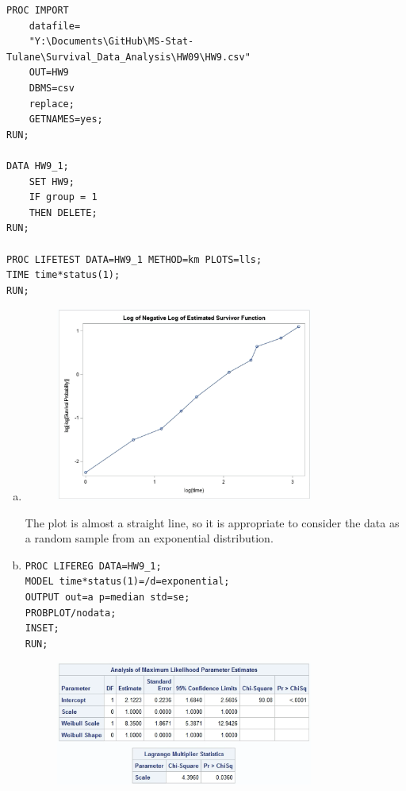 \documentclass{elegantbook}
\begin{document}
\begin{solution}
    \begin{verbatim}
PROC IMPORT
    datafile=
    "Y:\Documents\GitHub\MS-Stat-Tulane\Survival_Data_Analysis\HW09\HW9.csv"
    OUT=HW9
    DBMS=csv
    replace;
    GETNAMES=yes;
RUN;

DATA HW9_1;
    SET HW9;
    IF group = 1
    THEN DELETE;
RUN;

PROC LIFETEST DATA=HW9_1 METHOD=km PLOTS=lls;
TIME time*status(1);
RUN;
    \end{verbatim}
    \begin{enumerate}[(a)]
        \item \begin{figure}[H]
            \centering
            \includegraphics[width=0.8\textwidth]{HW9_1a.png}
        \end{figure}
        The plot is almost a straight line, so it is appropriate to consider the data as a random sample from an exponential distribution.
        \item \begin{verbatim}
PROC LIFEREG DATA=HW9_1;
MODEL time*status(1)=/d=exponential;
OUTPUT out=a p=median std=se;
PROBPLOT/nodata;
INSET;
RUN;
        \end{verbatim}
        \begin{figure}[H]
            \centering
            \includegraphics[width=0.8\textwidth]{HW9_1b.png}

\end{figure}
\end{enumerate}
\end{solution}
\end{document}
